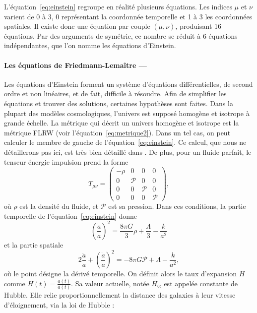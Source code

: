 \documentclass[11pt, twoside, a4paper, openright]{report}
\begin{document}
L'équation~\ref{eq:einstein} regroupe en réalité plusieurs équations. Les indices $\mu$ et $\nu$ varient de 0 à 3, 0 représentant la coordonnée temporelle et 1 à 3 les coordonnées spatiales. Il existe donc une équation par couple $(\mu, \nu)$, produisant 16 équations. Par des arguments de symétrie, ce nombre se réduit à 6 équations indépendantes, que l'on nomme les équations d'Einstein.

\paragraph{Les équations de Friedmann-Lemaître —}
Les équations d'Einstein forment un système d'équations différentielles, de second ordre et non linéaires, et de fait, difficile à résoudre. Afin de simplifier les équations et trouver des solutions, certaines hypothèses sont faites. Dans la plupart des modèles cosmologiques, l'univers est supposé homogène et isotrope à grande échelle.
La métrique qui décrit un univers homogène et isotrope est la métrique FLRW (voir l'équation~\ref{eq:metrique2}).
Dans un tel cas, on peut calculer le membre de gauche de l'équation~\ref{eq:einstein}. Ce calcul, que nous ne détaillerons pas ici, est très bien détaillé dans \cite{prov: Dodelson 2.1.2}. De plus, pour un fluide parfait, le tenseur énergie impulsion prend la forme
\begin{equation}
  T_{\mu \nu} =
  \begin{pmatrix}
    -\rho & 0 & 0 & 0 \\
    0 & \mathcal{P} & 0 & 0\\
    0 & 0 & \mathcal{P} & 0\\
    0 & 0 & 0 & \mathcal{P}
  \end{pmatrix} ,
\end{equation}
où $\rho$ est la densité du fluide, et $\mathcal{P}$ est sa pression. Dans ces conditions, la partie temporelle de l'équation~\ref{eq:einstein} donne
\begin{equation}
  \label{eq:friedmann1}
  \left(\frac{\dot{a}}{a}\right)^2 = \frac{8 \pi G}{3}\rho + \frac{\Lambda}{3} - \frac{k}{a^2} 
\end{equation}
et la partie spatiale
\begin{equation}
  \label{eq:friedmann2}
  2 \frac{\ddot{a}}{a} + \left(\frac{\dot{a}}{a}\right)^2 = - 8 \pi G \mathcal{P} + \Lambda - \frac{k}{a^2} ,
\end{equation}
où le point désigne la dérivé temporelle. On définit alors le taux d'expansion $H$ comme $H(t) = \frac{\dot{a}(t)}{a(t)}$. Sa valeur actuelle, notée $H₀$, est appelée constante de Hubble. Elle relie proportionnellement la distance des galaxies à leur vitesse d'éloignement, via la loi de Hubble :
\end{document}
